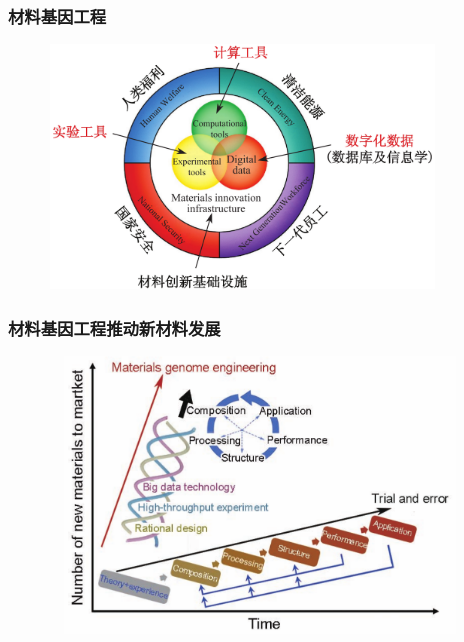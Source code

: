 \frame
{
	\frametitle{材料基因工程}
\begin{figure}[h!]
\vspace*{-0.18in}
\centering
\includegraphics[height=2.55in,width=4.05in]{Figures/MGE.png}
\label{MGE}
\end{figure}
}

\begin{frame}
	\frametitle{材料基因工程推动新材料发展}
\begin{figure}[h!]
\vspace*{-0.25in}
\centering
\includegraphics[height=2.90in,width=4.80in,viewport=0 0 1250 710,clip]{Figures/MGE_idea.png}
\label{MGE_idea}
\end{figure}
\end{frame}

